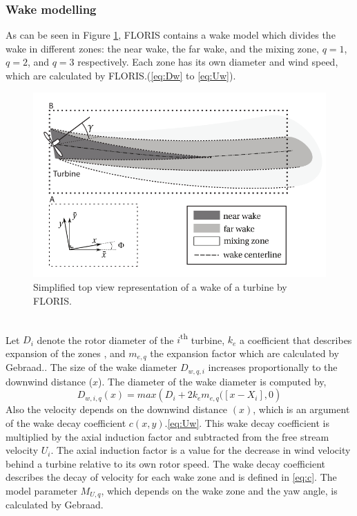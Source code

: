 \subsubsection{Wake modelling}
\label{wakemodel}
As can be seen in Figure \ref{fig:wake}, FLORIS  contains a wake model which divides the wake in different zones: the near wake, the far wake, and  the mixing zone, $q = 1$, $q = 2$, and $q = 3$ respectively. Each zone has its own diameter and wind speed, which are calculated by FLORIS.(\ref{eq:Dw} to \ref{eq:Uw}). 
\begin{figure}
  	\includegraphics[width=\linewidth]{./Figures/WakeFLORIS.png}
  	\caption{Simplified top view representation of a wake of a turbine by FLORIS.\cite{Gebraad2016}   }
	\label{fig:wake}
\end{figure}
\\
Let $D_i$ denote the rotor diameter of the $i${\textsuperscript{th}} turbine, $k_e$ a coefficient that describes expansion of the zones , and $m_{e,q}$ the expansion factor which are calculated by Gebraad.\cite{Gebraad2016}. The size of the wake diameter $D_{w,q,i}$ increases proportionally to  the downwind distance ($x$). The diameter of the wake diameter is computed by,
\begin{equation}
\label{eq:Dw}
D_{w,i,q}(x) = max({D_i + 2k_em_{e,q}([x - X_i],0} )
\end{equation}
Also the velocity depends on the downwind distance $(x)$, which is an argument of the wake decay coefficient $c(x,y)$.\ref{eq:Uw}. This wake decay coefficient is multiplied by the axial induction factor and subtracted from the free stream velocity $U_i$. The axial induction factor is a value for the decrease in wind velocity behind a turbine relative to its own rotor speed. The wake decay coefficient describes the decay of velocity for each wake zone and is defined in \ref{eq:c}. The model parameter $M_{U,q}$, which depends on the wake zone and the yaw angle, is calculated by Gebraad.\cite{Gebraad2016}   

